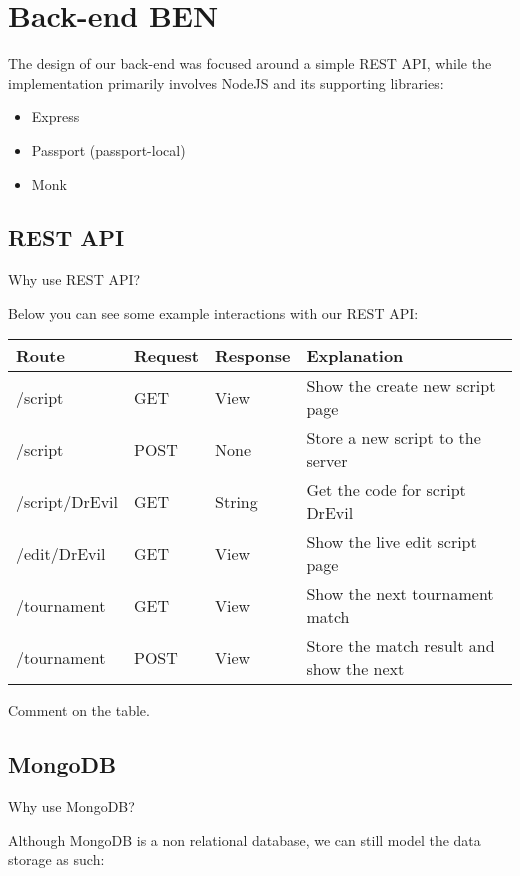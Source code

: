 \section{Back-end {\color{green} BEN}}

The design of our back-end was focused around a simple REST API, while the implementation primarily involves NodeJS and its supporting libraries:
	\begin{itemize}
	        \item Express
		\item Passport (passport-local)
		\item Monk
	\end{itemize}

\subsection{REST API}
Why use REST API?

Below you can see some example interactions with our REST API:\\

\begin{center}
\begin{tabular}{| l | l | l | l |}\hline
Route & Request &  Response & Explanation\\\hline\hline
/script & GET & View & Show the create new script page\\\hline
/script & POST & None & Store a new script to the server\\\hline
/script/DrEvil & GET & String & Get the code for script DrEvil\\\hline
/edit/DrEvil & GET & View & Show the live edit script page\\\hline
/tournament & GET & View & Show the next tournament match\\\hline
/tournament & POST & View & Store the match result and show the next \\\hline
\end{tabular}
\end{center}

Comment on the table.

\subsection{MongoDB}
Why use MongoDB?

Although MongoDB is a non relational database, we can still model the data storage as such:

